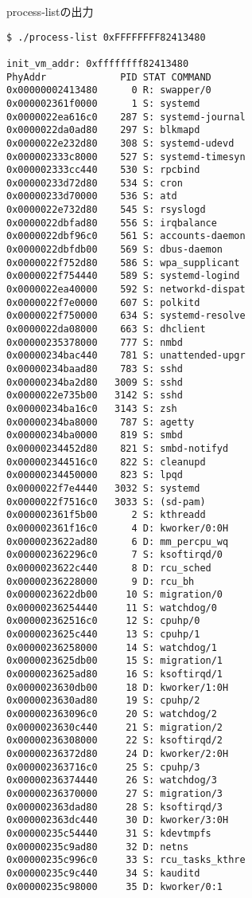 \begin{itembox}[l]{process-listの出力}
    \label{itembox:result-process-list}
    \begin{verbatim}
$ ./process-list 0xFFFFFFFF82413480

init_vm_addr: 0xffffffff82413480
PhyAddr             PID STAT COMMAND
0x00000002413480      0 R: swapper/0
0x000002361f0000      1 S: systemd
0x0000022ea616c0    287 S: systemd-journal
0x0000022da0ad80    297 S: blkmapd
0x0000022e232d80    308 S: systemd-udevd
0x000002333c8000    527 S: systemd-timesyn
0x000002333cc440    530 S: rpcbind
0x00000233d72d80    534 S: cron
0x00000233d70000    536 S: atd
0x0000022e732d80    545 S: rsyslogd
0x0000022dbfad80    556 S: irqbalance
0x0000022dbf96c0    561 S: accounts-daemon
0x0000022dbfdb00    569 S: dbus-daemon
0x0000022f752d80    586 S: wpa_supplicant
0x0000022f754440    589 S: systemd-logind
0x0000022ea40000    592 S: networkd-dispat
0x0000022f7e0000    607 S: polkitd
0x0000022f750000    634 S: systemd-resolve
0x0000022da08000    663 S: dhclient
0x00000235378000    777 S: nmbd
0x00000234bac440    781 S: unattended-upgr
0x00000234baad80    783 S: sshd
0x00000234ba2d80   3009 S: sshd
0x0000022e735b00   3142 S: sshd
0x00000234ba16c0   3143 S: zsh
0x00000234ba8000    787 S: agetty
0x00000234ba0000    819 S: smbd
0x00000234452d80    821 S: smbd-notifyd
0x000002344516c0    822 S: cleanupd
0x00000234450000    823 S: lpqd
0x0000022f7e4440   3032 S: systemd
0x0000022f7516c0   3033 S: (sd-pam)
0x000002361f5b00      2 S: kthreadd
0x000002361f16c0      4 D: kworker/0:0H
0x0000023622ad80      6 D: mm_percpu_wq
0x000002362296c0      7 S: ksoftirqd/0
0x0000023622c440      8 D: rcu_sched
0x00000236228000      9 D: rcu_bh
0x0000023622db00     10 S: migration/0
0x00000236254440     11 S: watchdog/0
0x000002362516c0     12 S: cpuhp/0
0x0000023625c440     13 S: cpuhp/1
0x00000236258000     14 S: watchdog/1
0x0000023625db00     15 S: migration/1
0x0000023625ad80     16 S: ksoftirqd/1
0x0000023630db00     18 D: kworker/1:0H
0x0000023630ad80     19 S: cpuhp/2
0x000002363096c0     20 S: watchdog/2
0x0000023630c440     21 S: migration/2
0x00000236308000     22 S: ksoftirqd/2
0x00000236372d80     24 D: kworker/2:0H
0x000002363716c0     25 S: cpuhp/3
0x00000236374440     26 S: watchdog/3
0x00000236370000     27 S: migration/3
0x000002363dad80     28 S: ksoftirqd/3
0x000002363dc440     30 D: kworker/3:0H
0x00000235c54440     31 S: kdevtmpfs
0x00000235c9ad80     32 D: netns
0x00000235c996c0     33 S: rcu_tasks_kthre
0x00000235c9c440     34 S: kauditd
0x00000235c98000     35 D: kworker/0:1

\end{verbatim}
\end{itembox}
